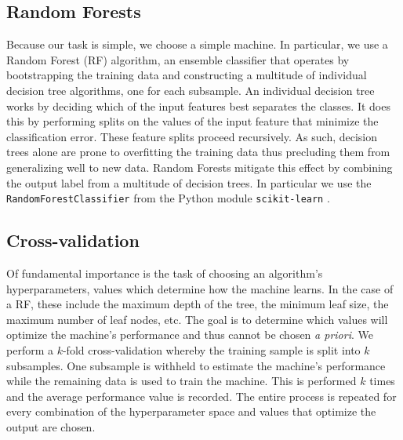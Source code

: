 \documentclass[twocolumn]{aastex6}
\begin{document}
\subsection{Random Forests}
Because our task is simple, we choose a simple machine. In particular, we use 
a Random Forest (RF) algorithm,  an ensemble classifier that operates by bootstrapping
the training data and constructing a multitude of individual decision tree algorithms, 
one for each subsample.  An individual decision tree works by deciding which of 
the input features best separates the classes. It does this by performing 
splits on the values of the input feature that minimize the classification 
error. These feature splits proceed recursively. As such, decision trees alone are
 prone to overfitting the training data thus precluding them from generalizing 
well to new data. Random Forests mitigate this effect by combining the 
output label from a multitude of decision trees.  In particular we use the 
\texttt{RandomForestClassifier} from the Python module \texttt{scikit-learn}
\citep{scikit-learn}. 

\subsection{Cross-validation}
Of fundamental importance is the task of choosing an algorithm's hyperparameters, 
values which determine how the machine learns.  In the case of a RF, these include
 the maximum depth of the tree, the minimum leaf size, the maximum
number of leaf nodes, etc. The goal is to determine which values will optimize 
the machine's performance and thus cannot be chosen \textit{a priori}. 
We perform a $k$-fold cross-validation whereby the 
training sample is split into $k$ subsamples. One subsample is withheld to 
estimate the machine's performance while the remaining data is used to train the machine. 
This is performed $k$ times and the average performance
value is recorded. The entire process is repeated for every combination of the 
 hyperparameter space and values that optimize the output are chosen. 
\end{document}
